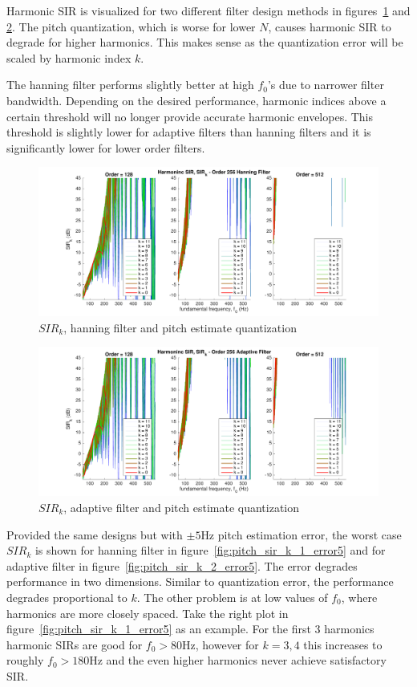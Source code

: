 \documentclass [11pt, proquest,oneside] {ganter_thesis}[2015/03/03]
\begin{document}
Harmonic SIR is visualized for two different filter design methods in figures~\ref{fig:pitch_sir_k_1} and \ref{fig:pitch_sir_k_2}.  The pitch quantization, which is worse for lower $N$, causes harmonic SIR to degrade for higher harmonics.  This makes sense as the quantization error will be scaled by harmonic index $k$.

The hanning filter performs slightly better at high $f_0$'s due to narrower filter bandwidth.  Depending on the desired performance, harmonic indices above a certain threshold will no longer provide accurate harmonic envelopes.  This threshold is slightly lower for adaptive filters than hanning filters and it is significantly lower for lower order filters.

\begin{figure}[!ht]
  \centering
    \includegraphics[width=1\textwidth]{pitch_sir_k_1}
    \caption{$SIR_k$, hanning filter and pitch estimate quantization}\label{fig:pitch_sir_k_1}
\end{figure}

\begin{figure}[!ht]
  \centering
    \includegraphics[width=1\textwidth]{pitch_sir_k_2}
    \caption{$SIR_k$, adaptive filter and pitch estimate quantization}\label{fig:pitch_sir_k_2}
\end{figure}

Provided the same designs but with $\pm5$Hz pitch estimation error, the worst case $SIR_k$ is shown for hanning filter in figure~\ref{fig:pitch_sir_k_1_error5} and for adaptive filter in figure~\ref{fig:pitch_sir_k_2_error5}.  The error degrades performance in two dimensions.  Similar to quantization error, the performance degrades proportional to $k$.  The other problem is at low values of $f_0$, where harmonics are more closely spaced.  Take the right plot in figure~\ref{fig:pitch_sir_k_1_error5} as an example.  For the first 3 harmonics harmonic SIRs are good for $f_0 > 80$Hz, however for $k = 3,4$ this increases to roughly $f_0 > 180$Hz and the even higher harmonics never achieve satisfactory SIR.
\end{document}
